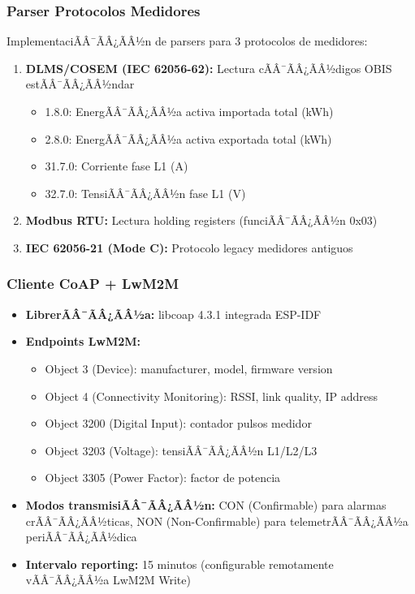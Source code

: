 \subsubsection{Parser Protocolos Medidores}

ImplementaciÃÂ¯ÃÂ¿ÃÂ½n de parsers para 3 protocolos de medidores:

\begin{enumerate}
\item \textbf{DLMS/COSEM (IEC 62056-62):} Lectura cÃÂ¯ÃÂ¿ÃÂ½digos OBIS estÃÂ¯ÃÂ¿ÃÂ½ndar
    \begin{itemize}
    \item 1.8.0: EnergÃÂ¯ÃÂ¿ÃÂ½a activa importada total (kWh)
    \item 2.8.0: EnergÃÂ¯ÃÂ¿ÃÂ½a activa exportada total (kWh)
    \item 31.7.0: Corriente fase L1 (A)
    \item 32.7.0: TensiÃÂ¯ÃÂ¿ÃÂ½n fase L1 (V)
    \end{itemize}
\item \textbf{Modbus RTU:} Lectura holding registers (funciÃÂ¯ÃÂ¿ÃÂ½n 0x03)
\item \textbf{IEC 62056-21 (Mode C):} Protocolo legacy medidores antiguos
\end{enumerate}

\subsubsection{Cliente CoAP + LwM2M}

\begin{itemize}
\item \textbf{LibrerÃÂ¯ÃÂ¿ÃÂ½a:} libcoap 4.3.1 integrada ESP-IDF
\item \textbf{Endpoints LwM2M:} 
    \begin{itemize}
    \item Object 3 (Device): manufacturer, model, firmware version
    \item Object 4 (Connectivity Monitoring): RSSI, link quality, IP address
    \item Object 3200 (Digital Input): contador pulsos medidor
    \item Object 3203 (Voltage): tensiÃÂ¯ÃÂ¿ÃÂ½n L1/L2/L3
    \item Object 3305 (Power Factor): factor de potencia
    \end{itemize}
\item \textbf{Modos transmisiÃÂ¯ÃÂ¿ÃÂ½n:} CON (Confirmable) para alarmas crÃÂ¯ÃÂ¿ÃÂ½ticas, NON (Non-Confirmable) para telemetrÃÂ¯ÃÂ¿ÃÂ½a periÃÂ¯ÃÂ¿ÃÂ½dica
\item \textbf{Intervalo reporting:} 15 minutos (configurable remotamente vÃÂ¯ÃÂ¿ÃÂ½a LwM2M Write)
\end{itemize}

